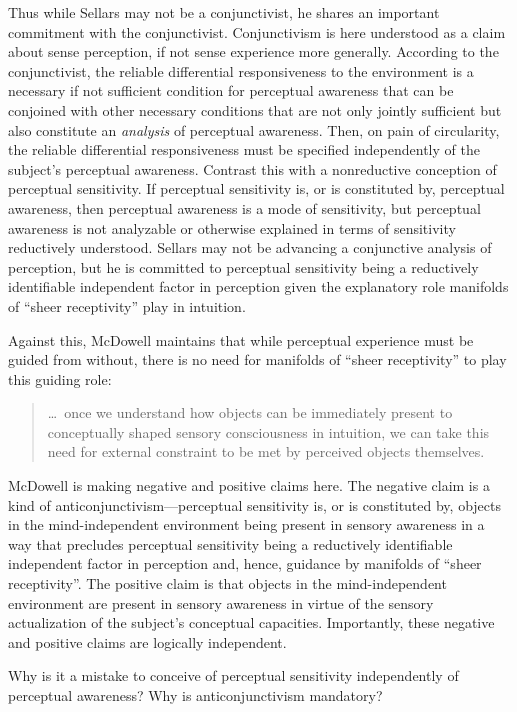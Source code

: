 \documentclass[12pt]{article}
\begin{document}
Thus while Sellars may not be a conjunctivist, he shares an important commitment with the conjunctivist. Conjunctivism is here understood as a claim about sense perception, if not sense experience more generally. According to the conjunctivist, the reliable differential responsiveness to the environment is a necessary if not sufficient condition for perceptual awareness that can be conjoined with other necessary conditions that are not only jointly sufficient but also constitute an \emph{analysis} of perceptual awareness. Then, on pain of circularity, the reliable differential responsiveness must be specified independently of the subject's perceptual awareness. Contrast this with a nonreductive conception of perceptual sensitivity. If perceptual sensitivity is, or is constituted by, perceptual awareness, then perceptual awareness is a mode of sensitivity, but perceptual awareness is not analyzable or otherwise explained in terms of sensitivity reductively understood. Sellars may not be advancing a conjunctive analysis of perception, but he is committed to perceptual sensitivity being a reductively identifiable independent factor in perception given the explanatory role manifolds of ``sheer receptivity'' play in intuition.

Against this, McDowell maintains that while perceptual experience must be guided from without, there is no need for manifolds of ``sheer receptivity'' to play this guiding role:
\begin{quote}
    \ldots\ once we understand how objects can be immediately present to conceptually shaped sensory consciousness in intuition, we can take this need for external constraint to be met by perceived objects themselves.
\end{quote}
McDowell is making negative and positive claims here. The negative claim is a kind of anticonjunctivism---perceptual sensitivity is, or is constituted by, objects in the mind-independent environment being present in sensory awareness in a way that precludes perceptual sensitivity being a reductively identifiable independent factor in perception and, hence, guidance by manifolds of ``sheer receptivity''. The positive claim is that objects in the mind-independent environment are present in sensory awareness in virtue of the sensory actualization of the subject's conceptual capacities. Importantly, these negative and positive claims are logically independent.

Why is it a mistake to conceive of perceptual sensitivity independently of perceptual awareness? Why is anticonjunctivism mandatory?
\end{document}
